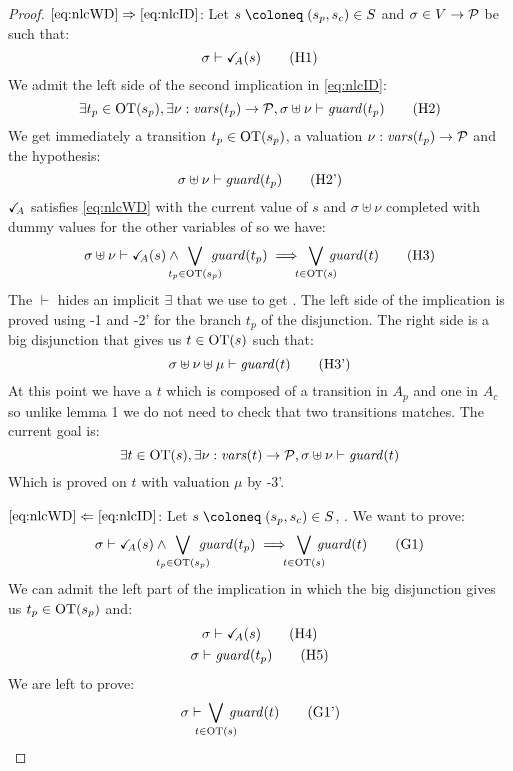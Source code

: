 \documentclass{article}
\begin{document}
\begin{proof}
\item[\(\eqref{eq:nlcWD}\Rightarrow\eqref{eq:nlcID}\):]
	Let \(s \defobject \mpar{s_p, s_c} \in S\) and \(\sigma \in V \to \mathcal{P}\) be such that:
	\[ \sigma \vdash \reach{A}\mpar{s} \hyp{1} \]
	We admit the left side of the second implication in \eqref{eq:nlcID}:
	\[ \exists t_p \in \fOT{s_p}, \exists \nu: \fvars{t_p} \to \values, \sigma \uplus \nu \vdash \fguard{t_p} \hyp{2} \]
	We get immediately a transition \(t_p \in \mathrm{OT}{\left(s_p\right)}\), a valuation \(\nu: \mathit{vars}{\left(t_p\right)} \to \mathcal{P}\) and the hypothesis:
	\[ \sigma \uplus \nu \vdash \fguard{t_p} \hyp{2'} \]
	\(\checkmark_{\!\! A}\) satisfies \eqref{eq:nlcWD} with the current value of \(s\) and \(\sigma \uplus \nu\) completed with dummy values for the other variables of  so we have:
	\[ \sigma \uplus \nu \vdash \reach{A}\mpar{s} \wedge \bigvee_\subbox{t_p \in \fOT{s_p}} \fguard{t_p} \implies \bigvee_\subbox{t \in \fOT{s}} \fguard{t} \hyp{3} \]
	The \(\vdash\) hides an implicit \(\exists\) that we use to get .
	The left side of the implication is proved using \hyp{1} and \hyp{2'} for the branch \(t_p\) of the disjunction.
	The right side is a big disjunction that gives us \(t \in \mathrm{OT}{\left(s\right)}\) such that:
	\[ \sigma \uplus \nu \uplus \mu \vdash \fguard{t} \hyp{3'} \]
	At this point we have a \(t\) which is composed of a transition in \(A_p\) and one in \(A_c\) so unlike lemma 1 we do not need to check that two transitions matches.
	The current goal is:
	\[ \exists t \in \mathrm{OT}{\left(s\right)}, \exists \nu: \mathit{vars}{\left(t\right)} \to \mathcal{P}, \sigma \uplus \nu \vdash \mathit{guard}{\left(t\right)} \]
	Which is proved on \(t\) with valuation \(\mu\) by \hyp{3'}.
\item[\(\eqref{eq:nlcWD}\Leftarrow\eqref{eq:nlcID}\):]
	Let \(s \defobject \mpar{s_p, s_c} \in S\), .
	We want to prove:
	\[ \sigma \vdash \reach{A}\mpar{s} \wedge \bigvee_\subbox{t_p \in \fOT{s_p}} \fguard{t_p} \implies \bigvee_\subbox{t \in \fOT{s}} \fguard{t} \goal{1} \]
	We can admit the left part of the implication in which the big disjunction gives us \(t_p \in \mathrm{OT}{\left(s_p\right)}\) and:\\
	\begin{gather}
		\sigma \vdash \reach{A}\mpar{s} \hyp{4} \\
		\sigma \vdash \fguard{t_p} \hyp{5}
	\end{gather}
	We are left to prove:
	\[ \sigma \vdash \bigvee_\subbox{t \in \fOT{s}} \fguard{t} \goal{1'} \]

\end{proof}
\end{document}
